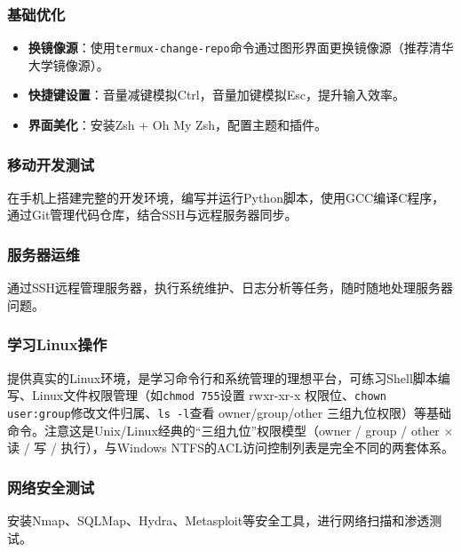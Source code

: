 \subsubsection*{基础优化}

\begin{itemize}
  \item \textbf{换镜像源}：使用\texttt{termux-\allowbreak change-\allowbreak repo}命令通过图形界面更换镜像源（推荐清华大学镜像源）。
  \item \textbf{快捷键设置}：音量减键模拟Ctrl，音量加键模拟Esc，提升输入效率。
  \item \textbf{界面美化}：安装Zsh + Oh My Zsh，配置主题和插件。
\end{itemize}


\subsubsection*{移动开发测试}

在手机上搭建完整的开发环境，编写并运行Python脚本，使用GCC编译C程序，通过Git管理代码仓库，结合SSH与远程服务器同步。

\subsubsection*{服务器运维}

通过SSH远程管理服务器，执行系统维护、日志分析等任务，随时随地处理服务器问题。

\subsubsection*{学习Linux操作}

提供真实的Linux环境，是学习命令行和系统管理的理想平台，可练习Shell脚本编写、Linux文件权限管理（如\texttt{chmod 755}设置 rwxr-xr-x 权限位、\texttt{chown user:group}修改文件归属、\texttt{ls -\allowbreak l}查看 owner/group/other 三组九位权限）等基础命令。注意这是Unix/Linux经典的“三组九位”权限模型（owner / group / other × 读 / 写 / 执行），与Windows NTFS的ACL访问控制列表是完全不同的两套体系。

\subsubsection*{网络安全测试}

安装Nmap、SQLMap、Hydra、Metasploit等安全工具，进行网络扫描和渗透测试。


